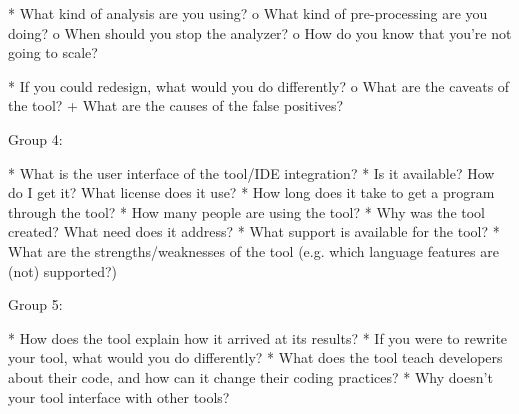 {    * What kind of analysis are you using?
          o What kind of pre-processing are you doing?
          o When should you stop the analyzer?
          o How do you know that you're not going to scale? 

    * If you could redesign, what would you do differently?
          o What are the caveats of the tool?
                + What are the causes of the false positives? 

Group 4:

    * What is the user interface of the tool/IDE integration?
    * Is it available? How do I get it? What license does it use?
    * How long does it take to get a program through the tool?
    * How many people are using the tool?
    * Why was the tool created? What need does it address?
    * What support is available for the tool?
    * What are the strengths/weaknesses of the tool (e.g. which language features are (not) supported?) 

Group 5:

    * How does the tool explain how it arrived at its results?
    * If you were to rewrite your tool, what would you do differently?
    * What does the tool teach developers about their code, and how can it change their coding practices?
    * Why doesn't your tool interface with other tools? 


}
